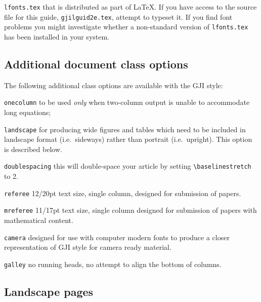 \verb"lfonts.tex" that is distributed as part of \LaTeX. If you have access to
the source file for this guide, \verb"gjilguid2e.tex", attempt to typeset it.
If you find font problems you might investigate whether a non-standard version
of \verb"lfonts.tex" has been installed in your system.

\subsection{Additional document class options}\label{classoptions}

The following additional class options are available with the GJI style:
\begin{description}
  \item \texttt{onecolumn} \textendash{} to be used \textit{only} when two-column output
        is unable to accommodate long equations;
  \item \texttt{landscape} \textendash{} for producing wide figures and tables which
        need to be included in landscape format (i.e.\ sideways) rather
        than portrait (i.e.\ upright). This option is described below.
  \item \texttt{doublespacing} \textendash{} this will double-space your
        article by setting \verb"\baselinestretch" to 2.
  \item \texttt{referee} \textendash{} 12/20pt text size, single column,
        designed for submission of papers.
  \item \texttt{mreferee} \textendash{} 11/17pt text size, single column
        designed for submission of papers with mathematical content.
  \item \texttt{camera} \textendash{} designed for use with computer modern fonts to
        produce a closer representation of GJI style for camera
        ready material.
  \item \texttt{galley} \textendash{} no running heads, no attempt to align
        the bottom of columns.
\end{description}


\subsection{Landscape pages}


